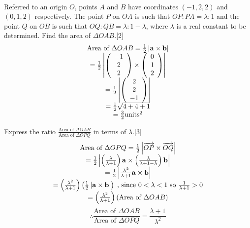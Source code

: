 \documentclass[12pt, a4 paper]{article}
\begin{document}
\begin{outline}[enumerate]
\begin{align*}
					\end{align*}
																						        
					\color{black}
					\1 Referred to an origin $O$, points $A$ and $B$ have coordinates $(-1,2,2)$ and $(0,1,2)$ respectively. The point $P$ on $OA$ is such that $OP:PA = \lambda :1$ and the point $Q$ on $OB$ is such that $OQ:QB = \lambda :1 - \lambda $, where $\lambda $ is a real constant to be determined.
					\2 Find the area of $\Delta OAB$.\hfill[2]
					\color{blue}
					\[\begin{array}{c}{\textrm{Area of }}\Delta OAB = \frac{1}{2}\left| {{\bf{a}} \times {\bf{b}}} \right|\\ = \frac{1}{2}\left| {\left( {\begin{array}{*{20}{c}}{ - 1}\\2\\2\end{array}} \right) \times \left( {\begin{array}{*{20}{c}}0\\1\\2\end{array}} \right)} \right|\\ = \frac{1}{2}\left| {\left( {\begin{array}{*{20}{c}}2\\2\\{ - 1}\end{array}} \right)} \right|\\ = \frac{1}{2}\sqrt {4 + 4 + 1} \\ = \frac{3}{2}{\textrm{unit}}{{\textrm{s}}^2}\end{array}\]
																						            
					\color{black}
					\2 Express the ratio $\frac{{{\textrm{Area of }}\Delta OAB}}{{{\textrm{Area of }}\Delta OPQ}}$ in terms of $\lambda $.\hfill[3]
					\color{blue}
					\[\begin{array}{c}{\textrm{Area of }}\Delta OPQ = \frac{1}{2}\left| {\overrightarrow {OP}  \times \overrightarrow {OQ} } \right|\\ = \frac{1}{2}\left| {\left( {\frac{\lambda }{{\lambda  + 1}}} \right){\bf{a}} \times \left( {\frac{\lambda }{{\lambda  + 1 - \lambda }}} \right){\bf{b}}} \right|\\ = \frac{1}{2}\left| {\frac{{{\lambda ^2}}}{{\lambda  + 1}}{\bf{a}} \times {\bf{b}}} \right|\\ = \left( {\frac{{{\lambda ^2}}}{{\lambda  + 1}}} \right)\left( {\frac{1}{2}\left| {{\bf{a}} \times {\bf{b}}} \right|} \right)\;{\textrm{, since }}0 < \lambda  < 1{\textrm{ so }}\frac{1}{{\lambda  + 1}} > 0\\ = \left( {\frac{{{\lambda ^2}}}{{\lambda  + 1}}} \right)\left( {{\textrm{Area of }}\Delta OAB} \right)\end{array}\]
					\[\therefore \frac{{{\textrm{Area of }}\Delta OAB}}{{{\textrm{Area of }}\Delta OPQ}} = \frac{{\lambda  + 1}}{{{\lambda ^2}}}\]
																						

\end{outline}
\end{document}

